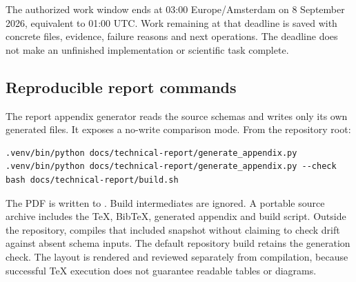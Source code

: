  The authorized work window ends at 03:00 Europe/Amsterdam on 8 September 2026, equivalent to 01:00 UTC. Work remaining at that deadline is saved with concrete files, evidence, failure reasons and next operations. The deadline does not make an unfinished implementation or scientific task complete.

\subsection{Reproducible report commands}

The report appendix generator reads the source schemas and writes only its own generated files. It exposes a no-write comparison mode. From the repository root:
\begin{lstlisting}
.venv/bin/python docs/technical-report/generate_appendix.py
.venv/bin/python docs/technical-report/generate_appendix.py --check
bash docs/technical-report/build.sh
\end{lstlisting}
The PDF is written to . Build intermediates are ignored. A portable source archive includes the TeX, BibTeX, generated appendix and build script. Outside the repository,  compiles that included snapshot without claiming to check drift against absent schema inputs. The default repository build retains the generation check. The layout is rendered and reviewed separately from compilation, because successful TeX execution does not guarantee readable tables or diagrams.
